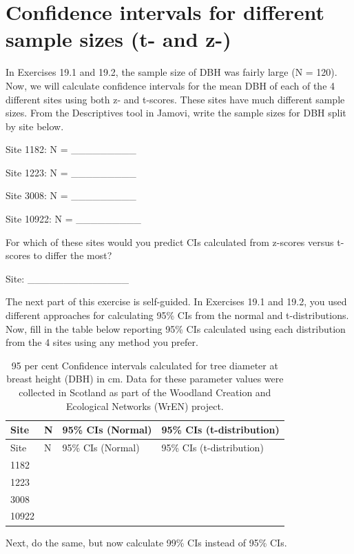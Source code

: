 \documentclass[
]{scrbook}
\begin{document}
\hypertarget{confidence-intervals-for-different-sample-sizes-t--and-z-}{%
\section{Confidence intervals for different sample sizes (t- and z-)}\label{confidence-intervals-for-different-sample-sizes-t--and-z-}}

In Exercises 19.1 and 19.2, the sample size of DBH was fairly large (N = 120).
Now, we will calculate confidence intervals for the mean DBH of each of the 4 different sites using both z- and t-scores.
These sites have much different sample sizes.
From the Descriptives tool in Jamovi, write the sample sizes for DBH split by site below.

Site 1182: N = \_\_\_\_\_\_\_\_\_

Site 1223: N = \_\_\_\_\_\_\_\_\_

Site 3008: N = \_\_\_\_\_\_\_\_\_

Site 10922: N = \_\_\_\_\_\_\_\_\_

For which of these sites would you predict CIs calculated from z-scores versus t-scores to differ the most?

Site: \_\_\_\_\_\_\_\_\_\_\_\_\_\_

The next part of this exercise is self-guided.
In Exercises 19.1 and 19.2, you used different approaches for calculating 95\% CIs from the normal and t-distributions.
Now, fill in the table below reporting 95\% CIs calculated using each distribution from the 4 sites using any method you prefer.

\begin{longtable}[]{@{}llll@{}}
\caption{95 per cent Confidence intervals calculated for tree diameter at breast height (DBH) in cm. Data for these parameter values were collected in Scotland as part of the Woodland Creation and Ecological Networks (WrEN) project.}\tabularnewline
\toprule
Site & N & 95\% CIs (Normal) & 95\% CIs (t-distribution) \\
\midrule
\endfirsthead
\toprule
Site & N & 95\% CIs (Normal) & 95\% CIs (t-distribution) \\
\midrule
\endhead
1182 & & & \\
1223 & & & \\
3008 & & & \\
10922 & & & \\
\bottomrule
\end{longtable}

Next, do the same, but now calculate 99\% CIs instead of 95\% CIs.
\end{document}

